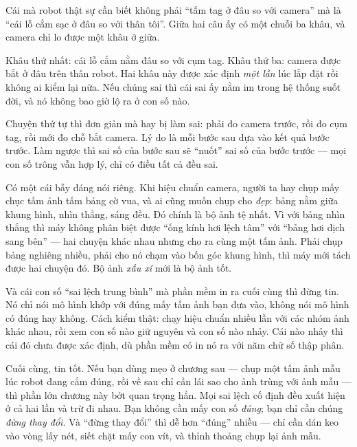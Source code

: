 \documentclass[../../marker.tex]{subfiles}
\begin{document}
\begin{dongian}
Cái mà robot thật sự cần biết không phải ``tấm tag ở đâu so với camera'' mà là ``cái lỗ cắm sạc ở đâu so với thân tôi''. Giữa hai câu ấy có một chuỗi ba khâu, và camera chỉ lo được một khâu ở giữa.

Khâu thứ nhất: cái lỗ cắm nằm đâu so với cụm tag. Khâu thứ ba: camera được bắt ở đâu trên thân robot. Hai khâu này được xác định \emph{một lần} lúc lắp đặt rồi không ai kiểm lại nữa. Nếu chúng sai thì cái sai ấy nằm im trong hệ thống suốt đời, và nó không bao giờ lộ ra ở con số nào.

Chuyện thứ tự thì đơn giản mà hay bị làm sai: phải đo camera trước, rồi đo cụm tag, rồi mới đo chỗ bắt camera. Lý do là mỗi bước sau dựa vào kết quả bước trước. Làm ngược thì sai số của bước sau sẽ ``nuốt'' sai số của bước trước --- mọi con số trông vẫn hợp lý, chỉ có điều tất cả đều sai.

Có một cái bẫy đáng nói riêng. Khi hiệu chuẩn camera, người ta hay chụp mấy chục tấm ảnh tấm bảng cờ vua, và ai cũng muốn chụp cho \emph{đẹp}: bảng nằm giữa khung hình, nhìn thẳng, sáng đều. Đó chính là bộ ảnh tệ nhất. Vì với bảng nhìn thẳng thì máy không phân biệt được ``ống kính hơi lệch tâm'' với ``bảng hơi dịch sang bên'' --- hai chuyện khác nhau nhưng cho ra cùng một tấm ảnh. Phải chụp bảng nghiêng nhiều, phải cho nó chạm vào bốn góc khung hình, thì máy mới tách được hai chuyện đó. Bộ ảnh \emph{xấu xí} mới là bộ ảnh tốt.

Và cái con số ``sai lệch trung bình'' mà phần mềm in ra cuối cùng thì đừng tin. Nó chỉ nói mô hình khớp với đúng mấy tấm ảnh bạn đưa vào, không nói mô hình có đúng hay không. Cách kiểm thật: chạy hiệu chuẩn nhiều lần với các nhóm ảnh khác nhau, rồi xem con số nào giữ nguyên và con số nào nhảy. Cái nào nhảy thì cái đó chưa được xác định, dù phần mềm có in nó ra với năm chữ số thập phân.

Cuối cùng, tin tốt. Nếu bạn dùng mẹo ở chương sau --- chụp một tấm ảnh mẫu lúc robot đang cắm đúng, rồi về sau chỉ cần lái sao cho ảnh trùng với ảnh mẫu --- thì phần lớn chương này bớt quan trọng hẳn. Mọi sai lệch cố định đều xuất hiện ở cả hai lần và trừ đi nhau. Bạn không cần mấy con số \emph{đúng}; bạn chỉ cần chúng \emph{đừng thay đổi}. Và ``đừng thay đổi'' thì dễ hơn ``đúng'' nhiều --- chỉ cần dán keo vào vòng lấy nét, siết chặt mấy con vít, và thỉnh thoảng chụp lại ảnh mẫu.

\end{dongian}
\end{document}
